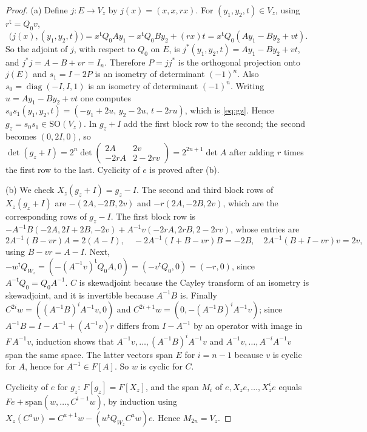 \documentclass[11pt,oneside,notitlepage]{book}
\numberwithin{equation}{section}
\theoremstyle{plain}
\theoremstyle{definition}
\newcommand{\SO}{\mathrm{SO}}
\newcommand{\diag}{\operatorname{diag}}
\begin{document}
\begin{proof}
(a) Define $j:E\to V_z$ by $j(x)=(x,x,rx)$. For $(y_1,y_2,t)\in V_z$, using $r^{\mathsf t}=Q_0v$,
\[\bigl(j(x),(y_1,y_2,t)\bigr)=x^{\mathsf t}Q_0Ay_1-x^{\mathsf t}Q_0By_2+(rx)t=x^{\mathsf t}Q_0(Ay_1-By_2+vt).\]
So the adjoint of $j$, with respect to $Q_0$ on $E$, is $j^*(y_1,y_2,t)=Ay_1-By_2+vt$, and $j^*j=A-B+vr=I_n$. Therefore $P=jj^*$ is the orthogonal projection onto $j(E)$ and $s_1=I-2P$ is an isometry of determinant $(-1)^n$. Also $s_0=\diag(-I,I,1)$ is an isometry of determinant $(-1)^n$. Writing $u=Ay_1-By_2+vt$ one computes $s_0s_1(y_1,y_2,t)=(-y_1+2u,\,y_2-2u,\,t-2ru)$, which is \eqref{eq:gz}. Hence $g_z=s_0s_1\in\SO(V_z)$. In $g_z+I$ add the first block row to the second; the second becomes $(0,2I,0)$, so $\det(g_z+I)=2^n\det\left(\begin{smallmatrix}2A&2v\\-2rA&2-2rv\end{smallmatrix}\right)=2^{2n+1}\det A$ after adding $r$ times the first row to the last. Cyclicity of $e$ is proved after (b).

(b) We check $X_z(g_z+I)=g_z-I$. The second and third block rows of $X_z(g_z+I)$ are $-(2A,-2B,2v)$ and $-r(2A,-2B,2v)$, which are the corresponding rows of $g_z-I$. The first block row is $-A^{-1}B(-2A,2I+2B,-2v)+A^{-1}v(-2rA,2rB,2-2rv)$, whose entries are
\[2A^{-1}(B-vr)A=2(A-I),\quad -2A^{-1}(I+B-vr)B=-2B,\quad 2A^{-1}(B+I-vr)v=2v,\]
using $B-vr=A-I$. Next, $-w^{\mathsf t}Q_{W_z}=(-(A^{-1}v)^{\mathsf t}Q_0A,0)=(-v^{\mathsf t}Q_0,0)=(-r,0)$, since $A^{-\mathsf t}Q_0=Q_0A^{-1}$. $C$ is skewadjoint because the Cayley transform of an isometry is skewadjoint, and it is invertible because $A^{-1}B$ is. Finally $C^{2i}w=((A^{-1}B)^iA^{-1}v,0)$ and $C^{2i+1}w=(0,-(A^{-1}B)^iA^{-1}v)$; since $A^{-1}B=I-A^{-1}+(A^{-1}v)r$ differs from $I-A^{-1}$ by an operator with image in $F\,A^{-1}v$, induction shows that $A^{-1}v,\dots,(A^{-1}B)^iA^{-1}v$ and $A^{-1}v,\dots,A^{-i}A^{-1}v$ span the same space. The latter vectors span $E$ for $i=n-1$ because $v$ is cyclic for $A$, hence for $A^{-1}\in F[A]$. So $w$ is cyclic for $C$.

Cyclicity of $e$ for $g_z$: $F[g_z]=F[X_z]$, and the span $M_i$ of $e,X_ze,\dots,X_z^ie$ equals $Fe+\mathrm{span}(w,\dots,C^{i-1}w)$, by induction using $X_z(C^aw)=C^{a+1}w-(w^{\mathsf t}Q_{W_z}C^aw)e$. Hence $M_{2n}=V_z$.


\end{proof}
\end{document}
